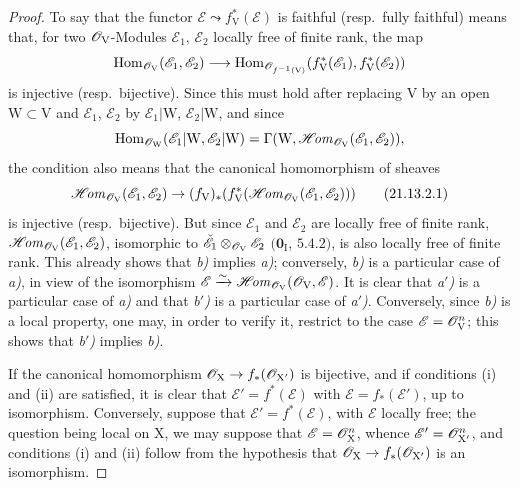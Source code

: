 \begin{proof}
To say that the functor $\mathscr{E}\leadsto f_{\mathrm{V}}^*(\mathscr{E})$ is faithful (resp.\ fully faithful) means that, for two $\mathscr{O}_{\mathrm{V}}$-Modules $\mathscr{E}_1$, $\mathscr{E}_2$ locally free of finite rank, the map
\[
  \operatorname{Hom}_{\mathscr{O}_{\mathrm{V}}}(\mathscr{E}_1,\mathscr{E}_2)
  \longrightarrow
  \operatorname{Hom}_{\mathscr{O}_{f^{-1}(\mathrm{V})}}(f_{\mathrm{V}}^*(\mathscr{E}_1),f_{\mathrm{V}}^*(\mathscr{E}_2))
\]
is injective (resp.\ bijective). Since this must hold after replacing $\mathrm{V}$ by an open $\mathrm{W}\subset\mathrm{V}$ and $\mathscr{E}_1$, $\mathscr{E}_2$ by $\mathscr{E}_1|\mathrm{W}$, $\mathscr{E}_2|\mathrm{W}$, and since
\[
  \operatorname{Hom}_{\mathscr{O}_{\mathrm{W}}}(\mathscr{E}_1|\mathrm{W},\mathscr{E}_2|\mathrm{W})
  =\Gamma(\mathrm{W},\mathscr{H}\!\mathit{om}_{\mathscr{O}_{\mathrm{V}}}(\mathscr{E}_1,\mathscr{E}_2)),
\]
the condition also means that the canonical homomorphism of sheaves
\[
\label{IV.21.13.2.1}
  \mathscr{H}\!\mathit{om}_{\mathscr{O}_{\mathrm{V}}}(\mathscr{E}_1,\mathscr{E}_2)\to(f_{\mathrm{V}})_*(f_{\mathrm{V}}^*(\mathscr{H}\!\mathit{om}_{\mathscr{O}_{\mathrm{V}}}(\mathscr{E}_1,\mathscr{E}_2)))
  \tag{21.13.2.1}
\]
is injective (resp.\ bijective).
But since $\mathscr{E}_1$ and $\mathscr{E}_2$ are locally free of finite rank, $\mathscr{H}\!\mathit{om}_{\mathscr{O}_{\mathrm{V}}}(\mathscr{E}_1,\mathscr{E}_2)$, isomorphic to $\check{\mathscr E}_1\otimes_{\mathscr{O}_{\mathrm{V}}}\mathscr{E}_2$ $(\mathbf{0}_{\mathrm{I}}$, $5.4.2)$, is also locally free of finite rank. This already shows that \emph{b)} implies \emph{a)}; conversely, \emph{b)} is a particular case of \emph{a)}, in view of the isomorphism $\mathscr{E}\xrightarrow{\sim}\mathscr{H}\!\mathit{om}_{\mathscr{O}_{\mathrm{V}}}(\mathscr{O}_{\mathrm{V}},\mathscr{E})$.
It is clear that \emph{a$'$)} is a particular case of \emph{a)} and that \emph{b$'$)} is a particular case of \emph{a$'$)}.
Conversely, since \emph{b)} is a local property, one may, in order to verify it, restrict to the case $\mathscr{E}=\mathscr{O}_{\mathrm{V}}^n$; this shows that \emph{b$'$)} implies \emph{b)}.

If the canonical homomorphism $\mathscr{O}_{\mathrm{X}}\to f_*(\mathscr{O}_{\mathrm{X}'})$ is bijective, and if conditions (i) and (ii) are satisfied, it is clear that $\mathscr{E}'=f^*(\mathscr{E})$ with $\mathscr{E}=f_*(\mathscr{E}')$, up to isomorphism.
Conversely, suppose that $\mathscr{E}'=f^*(\mathscr{E})$, with $\mathscr{E}$ locally free; the question being local on $\mathrm{X}$, we may suppose that $\mathscr{E}=\mathscr{O}_{\mathrm{X}}^n$, whence $\mathscr{E}'=\mathscr{O}_{\mathrm{X}'}^n$, and conditions (i) and (ii) follow from the hypothesis that $\mathscr{O}_{\mathrm{X}}\to f_*(\mathscr{O}_{\mathrm{X}'})$ is an isomorphism.
\end{proof}

